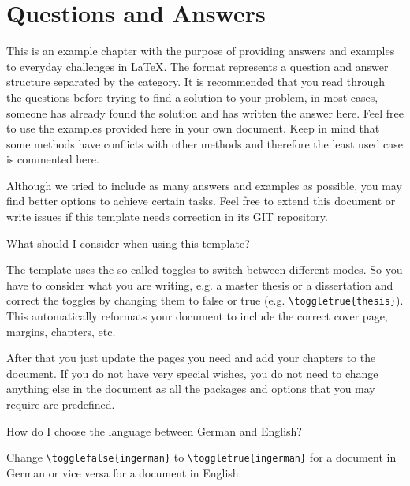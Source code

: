 \chapter{Questions and Answers}
\label{cha:QuestionsAndAnswers}

This is an example chapter with the purpose of providing answers and examples to everyday challenges in \LaTeX. The format represents a question and answer structure separated by the category. It is recommended that you read through the questions before trying to find a solution to your problem, in most cases, someone has already found the solution and has written the answer here. Feel free to use the examples provided here in your own document. Keep in mind that some methods have conflicts with other methods and therefore the least used case is commented here.

Although we tried to include as many answers and examples as possible, you may find better options to achieve certain tasks. Feel free to extend this document or write issues if this template needs correction in its GIT repository. 

\begin{QandA}
\item What should I consider when using this template?

	\begin{answered}
		The template uses the so called toggles to switch between different modes. So you have to consider what you are writing, e.g. a master thesis or a dissertation and correct the toggles by changing them to false or true (e.g. \verb|\toggletrue{thesis}|). This automatically reformats your document to include the correct cover page, margins, chapters, etc.
		
		After that you just update the pages you need and add your chapters to the document. If you do not have very special wishes, you do not need to change anything else in the document as all the packages and options that you may require are predefined.
	\end{answered}
	
	
	
\item How do I choose the language between German and English?

	\begin{answered}
		Change \verb|\togglefalse{ingerman}| to \verb|\toggletrue{ingerman}| for a document in German or vice versa for a document in English.
	\end{answered}

\end{QandA}

